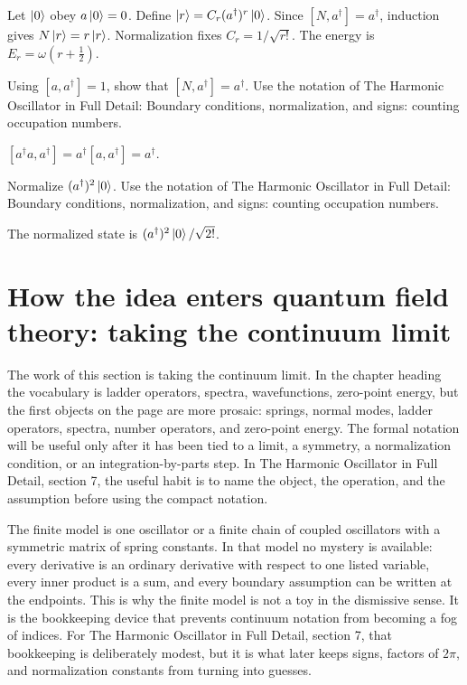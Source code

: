 \begin{example}
Let \(\left|0\right\rangle\) obey \(a\left|0\right\rangle=0\).  Define \(\left|r\right\rangle=C_r(a^\dagger)^r\left|0\right\rangle\).  Since \([N,a^\dagger]=a^\dagger\), induction gives \(N\left|r\right\rangle=r\left|r\right\rangle\).  Normalization fixes \(C_r=1/\sqrt{r!}\).  The energy is \(E_r=\omega(r+\frac12)\).
\end{example}



\begin{exercise}
Using \([a,a^\dagger]=1\), show that \([N,a^\dagger]=a^\dagger\).  Use the notation of The Harmonic Oscillator in Full Detail: Boundary conditions, normalization, and signs: counting occupation numbers.
\begin{answer}
\([a^\dagger a,a^\dagger]=a^\dagger[a,a^\dagger]=a^\dagger\).
\end{answer}
\end{exercise}

\begin{exercise}
Normalize \((a^\dagger)^2\left|0\right\rangle\).  Use the notation of The Harmonic Oscillator in Full Detail: Boundary conditions, normalization, and signs: counting occupation numbers.
\begin{answer}
The normalized state is \((a^\dagger)^2\left|0\right\rangle/\sqrt{2!}\).
\end{answer}
\end{exercise}



\section{How the idea enters quantum field theory: taking the continuum limit}

The work of this section is taking the continuum limit.  In the chapter heading the vocabulary is ladder operators, spectra, wavefunctions, zero-point energy, but the first objects on the page are more prosaic: springs, normal modes, ladder operators, spectra, number operators, and zero-point energy.  The formal notation will be useful only after it has been tied to a limit, a symmetry, a normalization condition, or an integration-by-parts step.  In The Harmonic Oscillator in Full Detail, section 7, the useful habit is to name the object, the operation, and the assumption before using the compact notation.

The finite model is one oscillator or a finite chain of coupled oscillators with a symmetric matrix of spring constants.  In that model no mystery is available: every derivative is an ordinary derivative with respect to one listed variable, every inner product is a sum, and every boundary assumption can be written at the endpoints.  This is why the finite model is not a toy in the dismissive sense.  It is the bookkeeping device that prevents continuum notation from becoming a fog of indices.  For The Harmonic Oscillator in Full Detail, section 7, that bookkeeping is deliberately modest, but it is what later keeps signs, factors of \(2\pi\), and normalization constants from turning into guesses.

